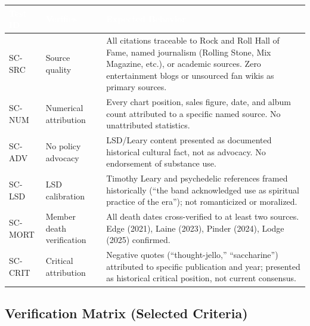 \documentclass[11pt,letterpaper]{article}
\newcommand{\tableheader}[1]{\textbf{\sffamily\textcolor{white}{#1}}}
\begin{document}
\begin{center}
\begin{tabularx}{\textwidth}{C{1.5cm}L{3.5cm}X}
\toprule
{}
\tableheader{Test ID} & \tableheader{Verifies} & \tableheader{Expected Behavior} \\
\midrule
SC-SRC & Source quality & All citations traceable to Rock and Roll Hall of Fame, named journalism (Rolling Stone, Mix Magazine, etc.), or academic sources. Zero entertainment blogs or unsourced fan wikis as primary sources. \\
SC-NUM & Numerical attribution & Every chart position, sales figure, date, and album count attributed to a specific named source. No unattributed statistics. \\
SC-ADV & No policy advocacy & LSD/Leary content presented as documented historical cultural fact, not as advocacy. No endorsement of substance use. \\
SC-LSD & LSD calibration & Timothy Leary and psychedelic references framed historically (``the band acknowledged use as spiritual practice of the era''); not romanticized or moralized. \\
SC-MORT & Member death verification & All death dates cross-verified to at least two sources. Edge (2021), Laine (2023), Pinder (2024), Lodge (2025) confirmed. \\
SC-CRIT & Critical attribution & Negative quotes (``thought-jello,'' ``saccharine'') attributed to specific publication and year; presented as historical critical position, not current consensus. \\
\bottomrule
\end{tabularx}
\end{center}

\subsection{Verification Matrix (Selected Criteria)}
\end{document}
